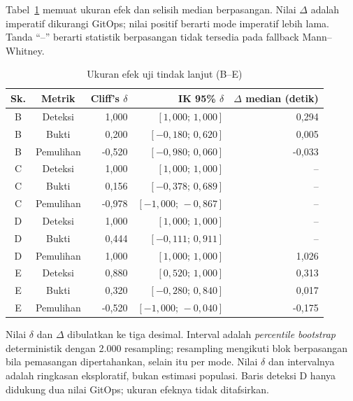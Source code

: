 Tabel~\ref{tab:lampiran-b-tindak-lanjut-efek} memuat ukuran efek dan selisih median berpasangan. Nilai $\Delta$ adalah imperatif dikurangi GitOps; nilai positif berarti mode imperatif lebih lama. Tanda ``--'' berarti statistik berpasangan tidak tersedia pada fallback Mann--Whitney.

\begin{table}[H]
  \centering
  \scriptsize
  \setlength{\tabcolsep}{2pt}
  \caption{Ukuran efek uji tindak lanjut (B--E)}
  \label{tab:lampiran-b-tindak-lanjut-efek}
  \begin{tabularx}{\textwidth}{|c|c|r|r|r|}
    \hline
    Sk. & Metrik & Cliff's $\delta$ & IK 95\% $\delta$ & $\Delta$ median (detik) \\
    \hline
    B & Deteksi & 1,000 & $[1{,}000;\,1{,}000]$ & 0,294 \\
    \hline
    B & Bukti & 0,200 & $[-0{,}180;\,0{,}620]$ & 0,005 \\
    \hline
    B & Pemulihan & -0,520 & $[-0{,}980;\,0{,}060]$ & -0,033 \\
    \hline
    C & Deteksi & 1,000 & $[1{,}000;\,1{,}000]$ & -- \\
    \hline
    C & Bukti & 0,156 & $[-0{,}378;\,0{,}689]$ & -- \\
    \hline
    C & Pemulihan & -0,978 & $[-1{,}000;\,-0{,}867]$ & -- \\
    \hline
    D & Deteksi & 1,000 & $[1{,}000;\,1{,}000]$ & -- \\
    \hline
    D & Bukti & 0,444 & $[-0{,}111;\,0{,}911]$ & -- \\
    \hline
    D & Pemulihan & 1,000 & $[1{,}000;\,1{,}000]$ & 1,026 \\
    \hline
    E & Deteksi & 0,880 & $[0{,}520;\,1{,}000]$ & 0,313 \\
    \hline
    E & Bukti & 0,320 & $[-0{,}280;\,0{,}840]$ & 0,017 \\
    \hline
    E & Pemulihan & -0,520 & $[-1{,}000;\,-0{,}040]$ & -0,175 \\
    \hline
  \end{tabularx}
\end{table}

\noindent\footnotesize Nilai $\delta$ dan $\Delta$ dibulatkan ke tiga desimal. Interval adalah \textit{percentile bootstrap} deterministik dengan 2.000 resampling; resampling mengikuti blok berpasangan bila pemasangan dipertahankan, selain itu per mode. Nilai $\delta$ dan intervalnya adalah ringkasan eksploratif, bukan estimasi populasi. Baris deteksi D hanya didukung dua nilai GitOps; ukuran efeknya tidak ditafsirkan.\normalsize

